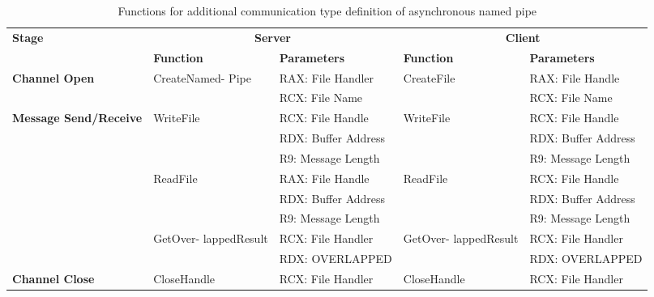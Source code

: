     \begin{table}[h]
        \centering
        \caption{Functions for additional communication type definition of asynchronous named pipe}
        \label{asynfunctions}
        \begin{tabular}{|p{1.8cm}|l|l|l|l|}
            \hline
             \multirow{2}{*}{\textbf{Stage}} &
               \multicolumn{2}{c|}{\textbf{Server}} &
               \multicolumn{2}{c|}{\textbf{Client}} \\
             \cline{2-5}
              & \textbf{Function}& \textbf{Parameters} & \textbf{Function} & \textbf{Parameters}  \\
             \hline
             \multirow{2}{*}{\parbox{1.8cm}{\textbf{Channel Open}}}
             &\multirow{2}{*}{\parbox{2.5cm}{CreateNamed- Pipe}} &  RAX: File Handler & \multirow{2}{*}{CreateFile} &  RAX: File Handle\\
              \cline{3-3} \cline{5-5}
             &&  RCX: File Name &  &  RCX: File Name\\
            \hline
             \multirow{8}{*}{\parbox{1.8cm}{\textbf{Message Send/Receive}}}
             &\multirow{3}{*}{WriteFile} &  RCX: File Handle & \multirow{3}{*}{WriteFile} &  RCX: File Handle\\
              \cline{3-3} \cline{5-5}
             &&  RDX: Buffer Address &  &  RDX: Buffer Address\\
                           \cline{3-3} \cline{5-5}
             & &  R9: Message Length &  &  R9: Message Length\\
            \cline{2-5} 

             & \multirow{3}{*}{ReadFile}&  RAX: File Handle & \multirow{3}{*}{ReadFile} &  RCX: File Handle\\
              \cline{3-3} \cline{5-5}
              &&  RDX: Buffer Address &  &  RDX: Buffer Address\\
                           \cline{3-3} \cline{5-5}
             & &  R9: Message Length &  &  R9: Message Length\\
              \cline{2-5} 
             & \multirow{2}{*}{\parbox{2.5cm}{GetOver- lappedResult}}&  RCX: File Handler & \multirow{2}{*}{\parbox{2.5cm}{GetOver- lappedResult}} &  RCX: File Handler\\
              \cline{3-3} \cline{5-5}
             & &  RDX:  OVERLAPPED&  &  RDX:  OVERLAPPED\\
                         \hline
                         
                          \multirow{2}{*}{\parbox{1.8cm}{\textbf{Channel Close}}}
             &\multirow{2}{*}{CloseHandle} & \multirow{2}{*}{RCX: File Handler} & \multirow{2}{*}{CloseHandle} &  \multirow{2}{*}{RCX: File Handler}\\
             &&   &  & \\
            \hline
        \end{tabular}
    \end{table}
    



